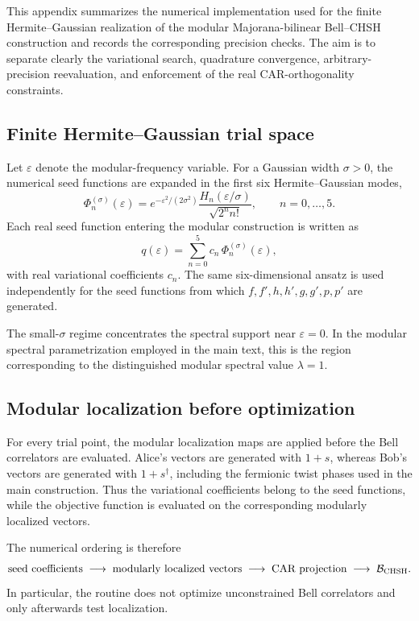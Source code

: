 \documentclass[11pt]{article}
\begin{document}
This appendix summarizes the numerical implementation used for the finite
Hermite--Gaussian realization of the modular Majorana-bilinear Bell--CHSH
construction and records the corresponding precision checks. The aim is to
separate clearly the variational search, quadrature convergence, arbitrary-
precision reevaluation, and enforcement of the real CAR-orthogonality
constraints.

\subsection{Finite Hermite--Gaussian trial space}

Let $\varepsilon$ denote the modular-frequency variable. For a Gaussian width
$\sigma>0$, the numerical seed functions are expanded in the first six
Hermite--Gaussian modes,
\begin{equation}
\Phi_n^{(\sigma)}(\varepsilon)
=
e^{-\varepsilon^2/(2\sigma^2)}
\frac{H_n(\varepsilon/\sigma)}{\sqrt{2^n n!}},
\qquad
n=0,\ldots,5 .
\label{eq:app-HG}
\end{equation}
Each real seed function entering the modular construction is written as
\begin{equation}
q(\varepsilon)
=
\sum_{n=0}^{5} c_n\,\Phi_n^{(\sigma)}(\varepsilon),
\label{eq:app-seed}
\end{equation}
with real variational coefficients $c_n$. The same six-dimensional ansatz is
used independently for the seed functions from which
$f,f',h,h',g,g',p,p'$ are generated.

The small-$\sigma$ regime concentrates the spectral support near
$\varepsilon=0$. In the modular spectral parametrization employed in the main
text, this is the region corresponding to the distinguished modular spectral
value $\lambda=1$.

\subsection{Modular localization before optimization}

For every trial point, the modular localization maps are applied before the Bell
correlators are evaluated. Alice's vectors are generated with $1+s$, whereas
Bob's vectors are generated with $1+s^\dagger$, including the fermionic twist
phases used in the main construction. Thus the variational coefficients belong
to the seed functions, while the objective function is evaluated on the
corresponding modularly localized vectors.

The numerical ordering is therefore
\begin{equation}
\text{seed coefficients}
\;\longrightarrow\;
\text{modularly localized vectors}
\;\longrightarrow\;
\text{CAR projection}
\;\longrightarrow\;
\mathcal B_{\rm CHSH}.
\label{eq:app-ordering}
\end{equation}
In particular, the routine does not optimize unconstrained Bell correlators and
only afterwards test localization.
\end{document}
